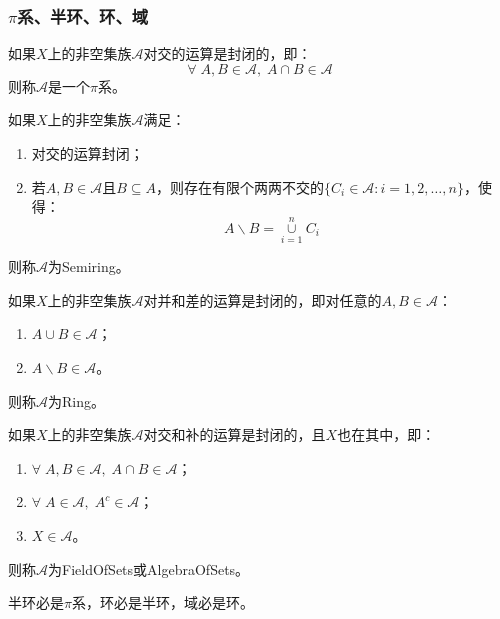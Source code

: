 \subsubsection{$\pi$系、半环、环、域}
\begin{definition}
	如果$X$上的非空集族$\mathscr{A}$对交的运算是封闭的，即：
	\begin{equation*}
		\forall\;A,B\in\mathscr{A},\;A\cap B\in\mathscr{A}
	\end{equation*}
	则称$\mathscr{A}$是一个$\pi$系。
\end{definition}
\begin{definition}
	如果$X$上的非空集族$\mathscr{A}$满足：
	\begin{enumerate}
		\item 对交的运算封闭；
		\item 若$A,B\in\mathscr{A}$且$B\subseteq A$，则存在有限个两两不交的$\{C_i\in\mathscr{A}:i=1,2,\dots,n\}$，使得：
		\begin{equation*}
			A\backslash B=\underset{i=1}{\overset{n}{\cup}}C_i
		\end{equation*}
	\end{enumerate}
	则称$\mathscr{A}$为\gls{Semiring}。
\end{definition}
\begin{definition}
	如果$X$上的非空集族$\mathscr{A}$对并和差的运算是封闭的，即对任意的$A,B\in\mathscr{A}$：
	\begin{enumerate}
		\item $A\cup B\in\mathscr{A}$；
		\item $A\backslash B\in\mathscr{A}$。
	\end{enumerate}
	则称$\mathscr{A}$为\gls{Ring}。
\end{definition}
\begin{definition}
	如果$X$上的非空集族$\mathscr{A}$对交和补的运算是封闭的，且$X$也在其中，即：
	\begin{enumerate}
		\item $\forall\;A,B\in\mathscr{A},\;A\cap B\in\mathscr{A}$；
		\item $\forall\;A\in\mathscr{A},\;A^c\in\mathscr{A}$；
		\item $X\in\mathscr{A}$。
	\end{enumerate}
	则称$\mathscr{A}$为\gls{FieldOfSets}或\gls{AlgebraOfSets}。
\end{definition}
\begin{theorem}\label{theo:SetNecessarilySet1}
	半环必是$\pi$系，环必是半环，域必是环。
\end{theorem}
